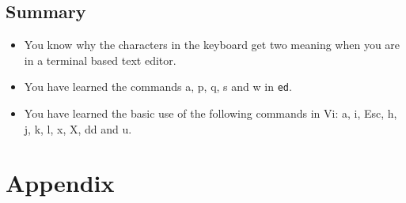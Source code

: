 \documentclass[11pt,a4paper,twoside]{article}
\begin{document}
%
%
%
%
%
%
%
%
%

\subsection*{Summary}
\begin{itemize}
\item You know why the characters in the keyboard get two meaning when you
are in a terminal based text editor.

\item You have learned the commands a, p, q, s and w in \texttt{ed}.

\item You have learned the basic use of the following commands in Vi: 
a, i, Esc, h, j, k, l, x, X, dd and u.
\end{itemize}


\newpage

\section*{Appendix}
\end{document}
